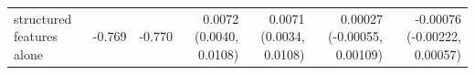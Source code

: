 \begin{tabular}{lrrrrrr}
structured features alone & -0.769 & -0.770 & 0.0072 (0.0040, 0.0108) & 0.0071 (0.0034, 0.0108) & 0.00027 (-0.00055, 0.00109) & -0.00076 (-0.00222, 0.00057) \\

\end{tabular}
